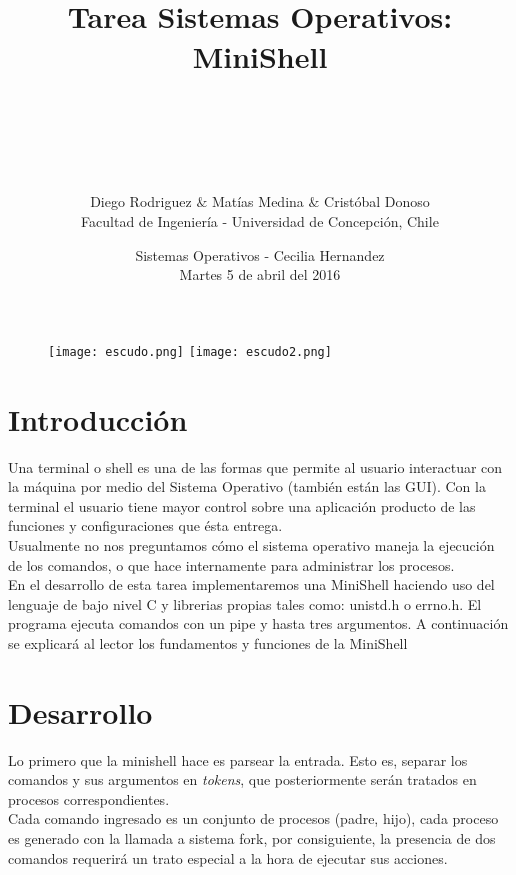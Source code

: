 \documentclass[11pt]{article}
\title{\textbf{\Huge{\\Tarea Sistemas Operativos: MiniShell}}}
\author{\\\\\\\\\\Diego Rodriguez $\&$ Matías Medina $\&$ Cristóbal Donoso\\
		Facultad de Ingeniería - Universidad de Concepción, Chile}
\date{Sistemas Operativos - Cecilia Hernandez \\Martes 5 de abril del 2016}
\begin{document}
\begin{titlepage}
\begin{center}
\vspace*{-1in}
\begin{figure}[htb]
\begin{center}
\texttt{[image: escudo.png]}
\texttt{[image: escudo2.png]}
\maketitle
\end{center}
\end{figure}
\end{center}
\end{titlepage}

\maketitle

\section{Introducción}
Una terminal o shell es una de las formas que permite al usuario interactuar con la máquina por medio del Sistema Operativo (también están las GUI). Con la terminal el usuario tiene mayor control sobre una aplicación producto de las funciones y configuraciones que ésta entrega.\\Usualmente no nos preguntamos cómo el sistema operativo maneja la ejecución de los comandos, o que hace internamente para administrar los procesos.\\
En el desarrollo de esta tarea implementaremos una MiniShell haciendo uso del lenguaje de bajo nivel C y librerias propias tales como: unistd.h o errno.h. El programa ejecuta comandos con un pipe y hasta tres argumentos. A continuación se explicará al lector los fundamentos y funciones de la MiniShell

\section{Desarrollo}
Lo primero que la minishell hace es parsear la entrada. Esto es, separar los comandos y sus argumentos en \emph{tokens}, que posteriormente serán tratados en procesos correspondientes.\\
Cada comando ingresado es un conjunto de procesos (padre, hijo), cada proceso es generado con la llamada a sistema fork, por consiguiente, la presencia de dos comandos requerirá un trato especial a la hora de ejecutar sus acciones.
\newpage
\end{document}
